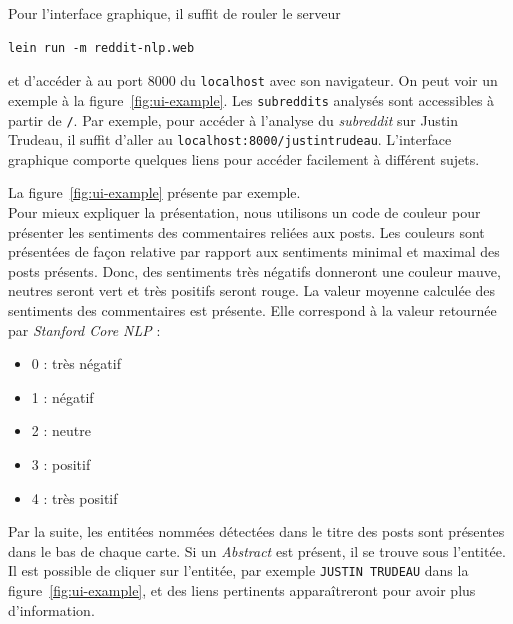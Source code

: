 \documentclass[12pt]{article}
\begin{document}
Pour l'interface graphique, il suffit de rouler le serveur

\begin{verbatim}
lein run -m reddit-nlp.web
\end{verbatim}

et d'accéder à au port 8000 du \verb;localhost; avec son navigateur. On peut voir un exemple à la figure~\ref{fig:ui-example}. Les \verb;subreddits; analysés sont accessibles à partir de \verb;/;. Par exemple, pour accéder à l'analyse du \emph{subreddit} sur Justin Trudeau, il suffit d'aller au \verb;localhost:8000/justintrudeau;.
L'interface graphique comporte quelques liens pour accéder facilement à différent sujets.

La figure~\ref{fig:ui-example} présente par exemple. \\

Pour mieux expliquer la présentation, nous utilisons un code de couleur pour présenter les sentiments des commentaires reliées aux posts. Les couleurs sont présentées de façon relative par rapport aux sentiments minimal et maximal des posts présents. Donc, des sentiments très négatifs donneront une couleur mauve, neutres seront vert et très positifs seront rouge. La valeur moyenne calculée des sentiments des commentaires est présente. Elle correspond à la valeur retournée par \textit{Stanford Core NLP} :

\begin{itemize}
\item 0 : très négatif
\item 1 : négatif
\item 2 : neutre
\item 3 : positif
\item 4 : très positif
\\
\end{itemize}

Par la suite, les entitées nommées détectées dans le titre des posts sont présentes dans le bas de chaque carte. Si un \textit{Abstract} est présent, il se trouve sous l'entitée. Il est possible de cliquer sur l'entitée, par exemple \verb;JUSTIN TRUDEAU; dans la figure~\ref{fig:ui-example}, et des liens pertinents apparaîtreront pour avoir plus d'information.
\end{document}

